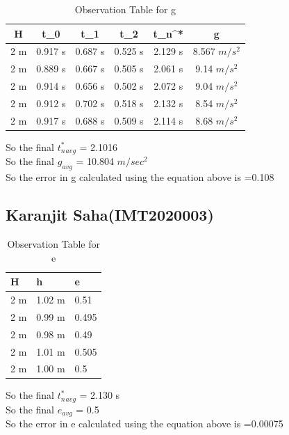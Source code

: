 \documentclass[11pt]{scrartcl} %
\begin{document}
\begin{table}[h]
\centering
\begin{tabular}{||c c c c c c||} 
\toprule
 \hline
 H & t_0 & t_1 & t_2 & t_n^* & g \\ [0.5ex] 
 \midrule
 \hline\hline
 2 m & 0.917 s & 0.687 s  & 0.525 s & 2.129 s & 8.567 $m/s^2$  \\ 
 \hline
 2 m & 0.889 s & 0.667 s & 0.505 s & 2.061 s & 9.14 $m/s^2$  \\
 \hline 
 2 m & 0.914 s & 0.656 s & 0.502 s & 2.072 s  & 9.04 $m/s^2$   \\
 \hline
 2 m & 0.912 s & 0.702 s & 0.518 s & 2.132 s  & 8.54 $m/s^2$   \\
 \hline
 2 m & 0.917 s & 0.688 s & 0.509 s & 2.114 s  & 8.68 $m/s^2$  \\ 
 [1ex]
 \bottomrule
 \hline
\end{tabular}
\caption{Observation Table for g}
\end{table}
So the final $t_n^*_{avg}$ = 2.1016\\
So the final $g_{avg}$ = 10.804 $m/sec^2$\\
So the error in g calculated using the equation above is =0.108 
\newpage
\subsection{Karanjit Saha(IMT2020003)}

\begin{table}[h] %
	\centering %
	\begin{tabular}{l l l}
		\toprule
		\textbf{H} & \textbf{h} & \textbf{e} \\
		\midrule
		2 m & 1.02 m & 0.51\\
		2 m & 0.99 m  & 0.495\\
		2 m & 0.98 m  & 0.49\\
		2 m & 1.01 m & 0.505 \\
		2 m & 1.00 m & 0.5 \\
		\bottomrule
	\end{tabular}
	\caption{Observation Table for e}
\end{table}
So the final $t_n^*_{avg}$ = 2.130 s\\
So the final $e_{avg}$ = 0.5\\
So the error in e calculated using the equation above is =0.00075 
\end{document}

